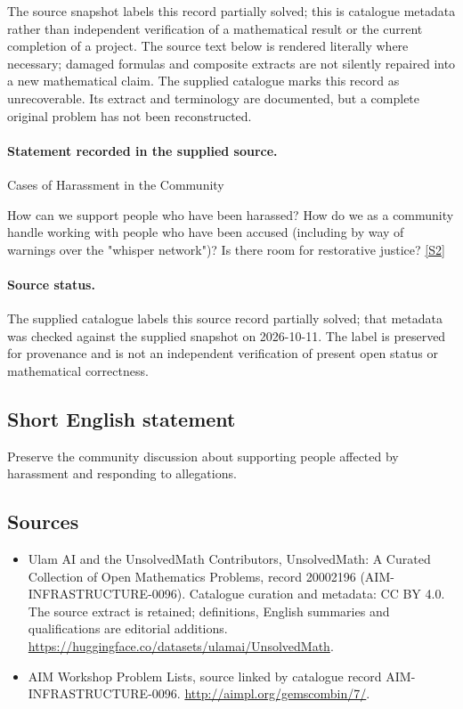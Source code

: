 \documentclass[11pt]{article}
\newcommand{\sref}[2]{\hyperlink{source:#1:#2}{[S#2]}}
\begin{document}
The source snapshot labels this record partially solved; this is catalogue metadata rather than independent verification of a mathematical result or the current completion of a project.
The source text below is rendered literally where necessary; damaged formulas and composite extracts are not silently repaired into a new mathematical claim.
The supplied catalogue marks this record as unrecoverable. Its extract and terminology are documented, but a complete original problem has not been reconstructed.
\paragraph{Statement recorded in the supplied source.}
Cases of Harassment in the Community

How can we support people who have been harassed? How do we as a community handle working with people who have been accused (including by way of warnings over the "whisper network")? Is there room for restorative justice? \sref{20002196}{2}
\paragraph{Source status.}
The supplied catalogue labels this source record partially solved; that metadata was checked against the supplied snapshot on 2026-10-11. The label is preserved for provenance and is not an independent verification of present open status or mathematical correctness.
\subsection{Short English statement}
Preserve the community discussion about supporting people affected by harassment and responding to allegations.
\subsection{Sources}
\begin{itemize}
\item[\hypertarget{source:20002196:1}{S1}] Ulam AI and the UnsolvedMath Contributors, UnsolvedMath: A Curated Collection of Open Mathematics Problems, record 20002196 (AIM-INFRASTRUCTURE-0096). Catalogue curation and metadata: CC BY 4.0. The source extract is retained; definitions, English summaries and qualifications are editorial additions.
\url{https://huggingface.co/datasets/ulamai/UnsolvedMath}.
\item[\hypertarget{source:20002196:2}{S2}] AIM Workshop Problem Lists, source linked by catalogue record AIM-INFRASTRUCTURE-0096.
\url{http://aimpl.org/gemscombin/7/}.
\end{itemize}
\end{document}
